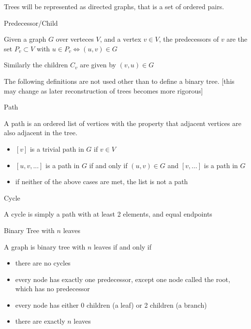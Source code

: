 \documentclass{report}
\begin{document}
Trees will be represented as directed graphs, that is a set of ordered pairs.

\begin{definition} Predecessor/Child

	Given a graph $G$ over verteces $V$, and a vertex $v \in V$, the predecessors of $v$ are the set $P_v \subset V$ with $u \in P_v \Leftrightarrow (u, v) \in G$

	Similarly the children $C_v$ are given by $(v, u) \in G$
\end{definition}

The following definitions are not used other than to define a binary tree. [this may change as later reconstruction of trees becomes more rigorous]

\begin{definition} Path

	A path is an ordered list of vertices with the property that adjacent vertices are also adjacent in the tree.

	\begin{itemize}
		\item $[v]$ is a trivial path in $G$ if $v \in V$
		\item $[u, v, ...]$ is a path in $G$ if and only if $(u, v) \in G$ and $[v, ...]$ is a path in $G$
		\item if neither of the above cases are met, the list is not a path
	\end{itemize}
\end{definition}

\begin{definition} Cycle

	A cycle is simply a path with at least 2 elements, and equal endpoints
\end{definition}

\begin{definition} Binary Tree with $n$ leaves

	A graph is binary tree with $n$ leaves if and only if
	\begin{itemize}
		\item there are no cycles
		\item every node has exactly one predecessor, except one node called the root, which has no predecessor
		\item every node has either 0 children (a leaf) or 2 children (a branch)
		\item there are exactly $n$ leaves
	\end{itemize}
\end{definition}
\end{document}
